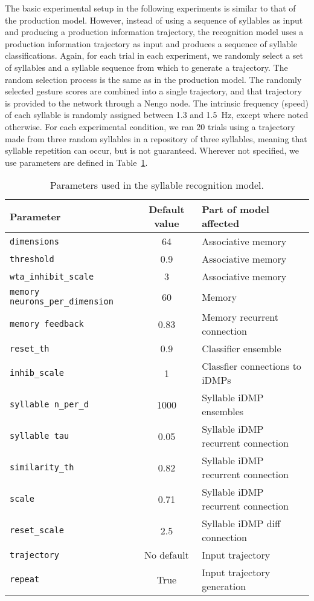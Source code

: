 The basic experimental setup
in the following experiments
is similar to that of the production model.
However, instead of using
a sequence of syllables
as input and producing
a production information trajectory,
the recognition model
uses a production information trajectory
as input and produces
a sequence of syllable classifications.
Again, for each trial in each experiment,
we randomly select a set of syllables
and a syllable sequence
from which to generate a trajectory.
The random selection process
is the same as in the production model.
The randomly selected
gesture scores are combined
into a single trajectory,
and that trajectory
is provided to the network
through a Nengo node.
The intrinsic frequency (speed)
of each syllable is randomly assigned
between 1.3 and 1.5~Hz,
except where noted otherwise.
For each experimental condition,
we ran 20 trials using
a trajectory made from
three random syllables
in a repository of three syllables,
meaning that syllable repetition can occur,
but is not guaranteed.
Wherever not specified,
we use parameters are defined in
Table~\ref{tab:recog}.

\begin{table}[ht!]
  \begin{footnotesize}
    \begin{center}
      \begin{tabular}{lcl}
        \toprule
        Parameter & Default value & Part of model affected \\
        \midrule
        \texttt{dimensions} & 64 & Associative memory \\
        \texttt{threshold} & 0.9 & Associative memory \\
        \texttt{wta\_inhibit\_scale} & 3 & Associative memory \\
        \texttt{memory neurons\_per\_dimension} & 60 & Memory \\
        \texttt{memory feedback} & 0.83 & Memory recurrent connection \\
        \texttt{reset\_th} & 0.9 & Classifier ensemble \\
        \texttt{inhib\_scale} & 1 & Classfier connections to iDMPs \\
        \texttt{syllable n\_per\_d} & 1000 & Syllable iDMP ensembles \\
        \texttt{syllable tau} & 0.05 & Syllable iDMP recurrent connection \\
        \texttt{similarity\_th} & 0.82 & Syllable iDMP recurrent connection \\
        \texttt{scale} & 0.71 & Syllable iDMP recurrent connection \\
        \texttt{reset\_scale} & 2.5 & Syllable iDMP diff connection \\
        \texttt{trajectory} & No default & Input trajectory \\
        \texttt{repeat} & True & Input trajectory generation \\
        \bottomrule
      \end{tabular}
    \end{center}
  \end{footnotesize}
  \caption{Parameters used in the syllable recognition model.}
\label{tab:recog}
\end{table}

